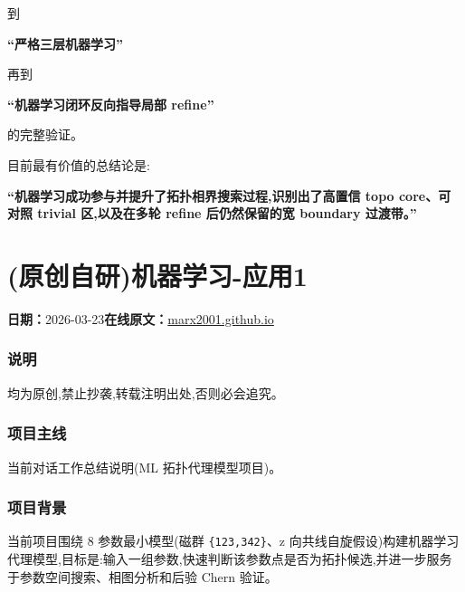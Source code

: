 \documentclass[lang=cn,scheme=chinese,color=blue,device=normal,toc=onecol,math=cm]{elegantbook}
\begin{document}
到\par


\textbf{“严格三层机器学习”}\par


再到\par


\textbf{“机器学习闭环反向指导局部 refine”}\par


的完整验证。\par


目前最有价值的总结论是:\par


\textbf{“机器学习成功参与并提升了拓扑相界搜索过程,识别出了高置信 topo core、可对照 trivial 区,以及在多轮 refine 后仍然保留的宽 boundary 过渡带。”}\par



\section{(原创自研)机器学习-应用1}
\begin{articlemeta}
\textbf{日期：}2026-03-23\hfill\textbf{在线原文：}\href{https://marx2001.github.io/sci-note\_posts/20260323-ML4}{marx2001.github.io}
\end{articlemeta}

\subsubsection{说明}


均为原创,禁止抄袭,转载注明出处,否则必会追究。\par


\subsubsection{项目主线}


当前对话工作总结说明(ML 拓扑代理模型项目)。\par


\subsubsection{项目背景}


当前项目围绕 8 参数最小模型(磁群 \texttt{\{123,342\}}、z 向共线自旋假设)构建机器学习代理模型,目标是:输入一组参数,快速判断该参数点是否为拓扑候选,并进一步服务于参数空间搜索、相图分析和后验 Chern 验证。\par
\end{document}

